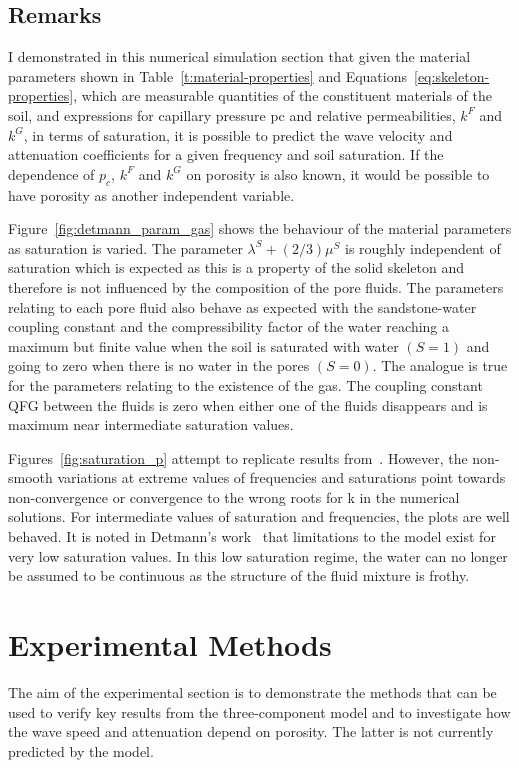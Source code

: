 \documentclass[twocolumn]{article}
\begin{document}
\subsection{Remarks}
I demonstrated in this numerical simulation section that given the material parameters shown in Table~\ref{t:material-properties} and Equations~\ref{eq:skeleton-properties}, which are measurable quantities of the constituent materials of the soil, and expressions for capillary pressure pc and relative permeabilities, $k^F$ and $k^G$, in terms of saturation, it is possible to predict the wave velocity and attenuation coefficients for a given frequency and soil saturation. If the dependence of $p_c$, $k^F$ and $k^G$ on porosity is also known, it would be possible to have porosity as another independent variable.

Figure~\ref{fig:detmann_param_gas} shows the behaviour of the material parameters as saturation is varied. The parameter $\lambda^S + (2/3)\mu^S$ is roughly independent of saturation which is expected as this is a property of the solid skeleton and therefore is not influenced by the composition of the pore fluids. The parameters relating to each pore fluid also behave as expected with the sandstone-water coupling constant and the compressibility factor of the water reaching a maximum but finite value when the soil is saturated with water $(S = 1)$ and going to zero when there is no water in the pores $(S = 0)$. The analogue is true for the parameters relating to the existence of the gas. The coupling constant QFG between the fluids is zero when either one of the fluids disappears and is maximum near intermediate saturation values.

Figures~\ref{fig:saturation_p} attempt to replicate results from~\cite{detmann_num_sim_2008}. However, the non-smooth variations at extreme values of frequencies and saturations point towards non-convergence or convergence to the wrong roots for k in the numerical solutions. For intermediate values of saturation and frequencies, the plots are well behaved. It is noted in Detmann’s work~\cite{detmann_analysis_2009} that limitations to the model exist for very low saturation values. In this low saturation regime, the water can no longer be assumed to be continuous as the structure of the fluid mixture is frothy.

\section{Experimental Methods}
The aim of the experimental section is to demonstrate the methods that can be used to verify key results from the three-component model and to investigate how the wave speed and attenuation depend on porosity. The latter is not currently predicted by the model.
\end{document}
